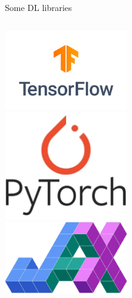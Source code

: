 \documentclass[notes, ignorenonframetext, compress, 10pt, xcolor=svgnames, aspectratio=169]{beamer}
\begin{document}
\begin{frame}[allowframebreaks]{Some DL libraries}
\begin{columns}[T] %
     \begin{column}{.5\textwidth}
     \begin{center}
 \includegraphics[width=0.4\textwidth]{../../Ressources/Figs/Fig_TensorFlowLogo.png}\\
  \includegraphics[width=0.4\textwidth]{../../Ressources/Figs/Fig_PytorchLogo.jpeg}\\
  \includegraphics[width=0.4\textwidth]{../../Ressources/Figs/Fig_JaxLogo.png}
  \end{center}
 \end{column}%


\end{columns}
\end{frame}
\end{document}
